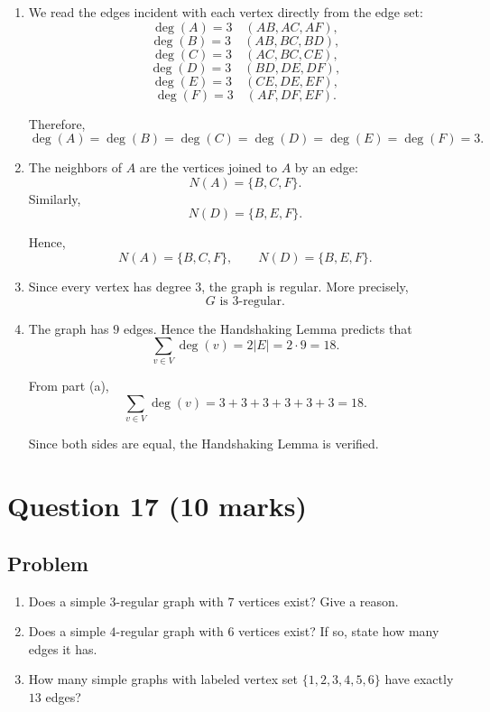 \documentclass[12pt]{article}
\begin{document}
\begin{enumerate}[label=(\alph*)]
    \item We read the edges incident with each vertex directly from the edge set:
    \[
    \deg(A)=3 \quad (AB,AC,AF),
    \]
    \[
    \deg(B)=3 \quad (AB,BC,BD),
    \]
    \[
    \deg(C)=3 \quad (AC,BC,CE),
    \]
    \[
    \deg(D)=3 \quad (BD,DE,DF),
    \]
    \[
    \deg(E)=3 \quad (CE,DE,EF),
    \]
    \[
    \deg(F)=3 \quad (AF,DF,EF).
    \]

    Therefore,
    \[
    \boxed{\deg(A)=\deg(B)=\deg(C)=\deg(D)=\deg(E)=\deg(F)=3.}
    \]

    \item The neighbors of $A$ are the vertices joined to $A$ by an edge:
    \[
    N(A)=\{B,C,F\}.
    \]
    Similarly,
    \[
    N(D)=\{B,E,F\}.
    \]

    Hence,
    \[
    \boxed{N(A)=\{B,C,F\},\qquad N(D)=\{B,E,F\}.}
    \]

    \item Since every vertex has degree $3$, the graph is regular. More precisely,
    \[
    \boxed{G\text{ is }3\text{-regular}.}
    \]

    \item The graph has $9$ edges. Hence the Handshaking Lemma predicts that
    \[
    \sum_{v\in V}\deg(v)=2|E|=2\cdot 9=18.
    \]

    From part (a),
    \[
    \sum_{v\in V}\deg(v)=3+3+3+3+3+3=18.
    \]

    Since both sides are equal, the Handshaking Lemma is verified.
\end{enumerate}

\newpage
\section{Question 17 \hfill (10 marks)}
\subsection{Problem}

\begin{enumerate}[label=(\alph*)]
    \item Does a simple $3$-regular graph with $7$ vertices exist? Give a reason.
    \item Does a simple $4$-regular graph with $6$ vertices exist? If so, state how many edges it has.
    \item How many simple graphs with labeled vertex set $\{1,2,3,4,5,6\}$ have exactly $13$ edges?
\end{enumerate}
\end{document}
